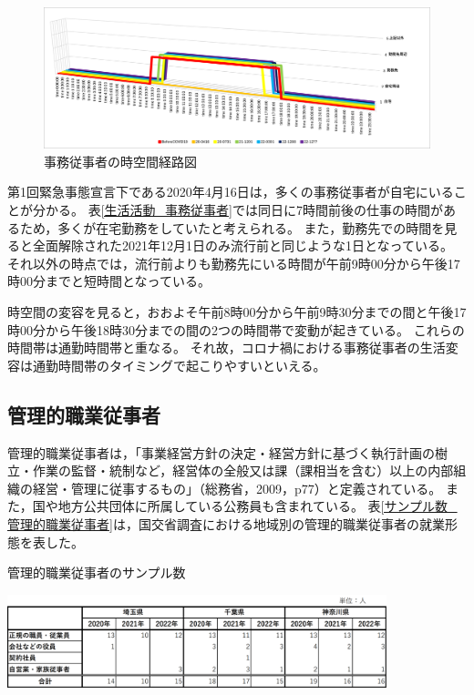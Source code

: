 \documentclass[paper={210mm,297mm},fontsize=15Q,line_length=35zw,number_of_lines=31,head_space=30mm,gutter=40mm,baselineskip=2.0zw,headfoot_verticalposition=1.5zw]{jlreq}
\begin{document}
\begin{figure}[H]
  \centering
  \includegraphics[scale=0.4]{../Figure/c04s01_fig_事務従事者_時空間経路図.png}
  \caption{事務従事者の時空間経路図}
  \label{時空間経路図_事務従事者}
\end{figure}

第1回緊急事態宣言下である2020年4月16日は，多くの事務従事者が自宅にいることが分かる。
表\ref{生活活動_事務従事者}では同日に7時間前後の仕事の時間があるため，多くが在宅勤務をしていたと考えられる。
また，勤務先での時間を見ると全面解除された2021年12月1日のみ流行前と同じような1日となっている。
それ以外の時点では，流行前よりも勤務先にいる時間が午前9時00分から午後17時00分までと短時間となっている。

時空間の変容を見ると，おおよそ午前8時00分から午前9時30分までの間と午後17時00分から午後18時30分までの間の2つの時間帯で変動が起きている。
これらの時間帯は通勤時間帯と重なる。
それ故，コロナ禍における事務従事者の生活変容は通勤時間帯のタイミングで起こりやすいといえる。

\subsection{管理的職業従事者}

管理的職業従事者は，「事業経営方針の決定・経営方針に基づく執行計画の樹立・作業の監督・統制など，経営体の全般又は課（課相当を含む）以上の内部組織の経営・管理に従事するもの」（総務省，2009，p77）と定義されている。
また，国や地方公共団体に所属している公務員も含まれている。
表\ref{サンプル数_管理的職業従事者}は，国交省調査における地域別の管理的職業従事者の就業形態を表した。

\begin{table}[H]
  \centering
  \caption{管理的職業従事者のサンプル数}
  \includegraphics[width=110mm]{../Figure/c04s02_table_管理的職業従事者_サンプル数.png}
  \label{サンプル数_管理的職業従事者}
\end{table}
\end{document}
